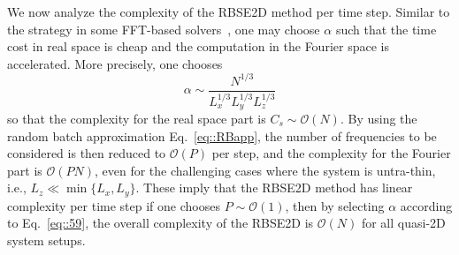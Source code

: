 We now analyze the complexity of the RBSE2D method per time step. 
Similar to the strategy in some FFT-based solvers~\cite{deserno1998mesh,lindbo2012fast}, one may choose $\alpha$ such that the time cost in real space is cheap and the computation in the Fourier space is accelerated. 
More precisely, one chooses
\begin{equation}\label{eq::59}
	\alpha\sim\frac{N^{1/3}}{L_x^{1/3}L_y^{1/3}L_z^{1/3}}
\end{equation}
so that the complexity for the real space part is $C_{s}\sim \mathcal{O}(N)$. 
By using the random batch approximation Eq.~\eqref{eq::RBapp}, the number of frequencies to be considered is then reduced to $\mathcal{O}(P)$ per step, and  the complexity for the Fourier part is $\mathcal{O}(PN)$, even for the challenging cases where the system is untra-thin, i.e., $L_z\ll \min\{L_x,L_y\}$.
These imply that the RBSE2D method has linear complexity per time step if one chooses $P\sim \mathcal{O}(1)$, then by selecting $\alpha$ according to Eq.~\eqref{eq::59}, 
the overall complexity of the RBSE2D is $\mathcal{O}(N)$ for all quasi-2D system setups.

